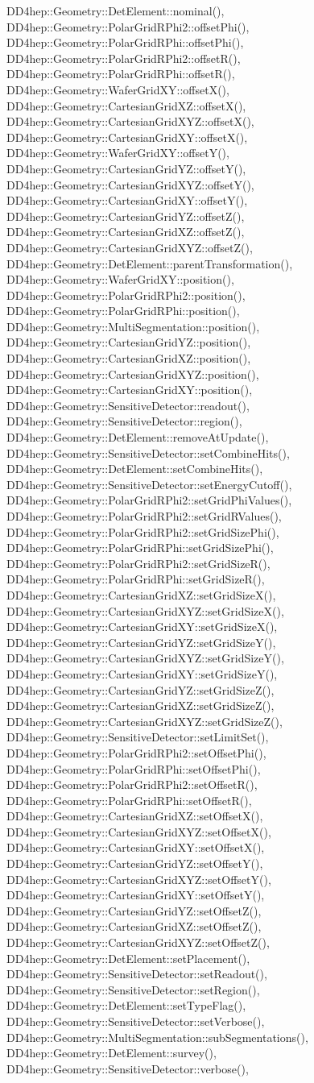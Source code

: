 DD4hep::Geometry::DetElement::nominal(), DD4hep::Geometry::PolarGridRPhi2::offsetPhi(), DD4hep::Geometry::PolarGridRPhi::offsetPhi(), DD4hep::Geometry::PolarGridRPhi2::offsetR(), DD4hep::Geometry::PolarGridRPhi::offsetR(), DD4hep::Geometry::WaferGridXY::offsetX(), DD4hep::Geometry::CartesianGridXZ::offsetX(), DD4hep::Geometry::CartesianGridXYZ::offsetX(), DD4hep::Geometry::CartesianGridXY::offsetX(), DD4hep::Geometry::WaferGridXY::offsetY(), DD4hep::Geometry::CartesianGridYZ::offsetY(), DD4hep::Geometry::CartesianGridXYZ::offsetY(), DD4hep::Geometry::CartesianGridXY::offsetY(), DD4hep::Geometry::CartesianGridYZ::offsetZ(), DD4hep::Geometry::CartesianGridXZ::offsetZ(), DD4hep::Geometry::CartesianGridXYZ::offsetZ(), DD4hep::Geometry::DetElement::parentTransformation(), DD4hep::Geometry::WaferGridXY::position(), DD4hep::Geometry::PolarGridRPhi2::position(), DD4hep::Geometry::PolarGridRPhi::position(), DD4hep::Geometry::MultiSegmentation::position(), DD4hep::Geometry::CartesianGridYZ::position(), DD4hep::Geometry::CartesianGridXZ::position(), DD4hep::Geometry::CartesianGridXYZ::position(), DD4hep::Geometry::CartesianGridXY::position(), DD4hep::Geometry::SensitiveDetector::readout(), DD4hep::Geometry::SensitiveDetector::region(), DD4hep::Geometry::DetElement::removeAtUpdate(), DD4hep::Geometry::SensitiveDetector::setCombineHits(), DD4hep::Geometry::DetElement::setCombineHits(), DD4hep::Geometry::SensitiveDetector::setEnergyCutoff(), DD4hep::Geometry::PolarGridRPhi2::setGridPhiValues(), DD4hep::Geometry::PolarGridRPhi2::setGridRValues(), DD4hep::Geometry::PolarGridRPhi2::setGridSizePhi(), DD4hep::Geometry::PolarGridRPhi::setGridSizePhi(), DD4hep::Geometry::PolarGridRPhi2::setGridSizeR(), DD4hep::Geometry::PolarGridRPhi::setGridSizeR(), DD4hep::Geometry::CartesianGridXZ::setGridSizeX(), DD4hep::Geometry::CartesianGridXYZ::setGridSizeX(), DD4hep::Geometry::CartesianGridXY::setGridSizeX(), DD4hep::Geometry::CartesianGridYZ::setGridSizeY(), DD4hep::Geometry::CartesianGridXYZ::setGridSizeY(), DD4hep::Geometry::CartesianGridXY::setGridSizeY(), DD4hep::Geometry::CartesianGridYZ::setGridSizeZ(), DD4hep::Geometry::CartesianGridXZ::setGridSizeZ(), DD4hep::Geometry::CartesianGridXYZ::setGridSizeZ(), DD4hep::Geometry::SensitiveDetector::setLimitSet(), DD4hep::Geometry::PolarGridRPhi2::setOffsetPhi(), DD4hep::Geometry::PolarGridRPhi::setOffsetPhi(), DD4hep::Geometry::PolarGridRPhi2::setOffsetR(), DD4hep::Geometry::PolarGridRPhi::setOffsetR(), DD4hep::Geometry::CartesianGridXZ::setOffsetX(), DD4hep::Geometry::CartesianGridXYZ::setOffsetX(), DD4hep::Geometry::CartesianGridXY::setOffsetX(), DD4hep::Geometry::CartesianGridYZ::setOffsetY(), DD4hep::Geometry::CartesianGridXYZ::setOffsetY(), DD4hep::Geometry::CartesianGridXY::setOffsetY(), DD4hep::Geometry::CartesianGridYZ::setOffsetZ(), DD4hep::Geometry::CartesianGridXZ::setOffsetZ(), DD4hep::Geometry::CartesianGridXYZ::setOffsetZ(), DD4hep::Geometry::DetElement::setPlacement(), DD4hep::Geometry::SensitiveDetector::setReadout(), DD4hep::Geometry::SensitiveDetector::setRegion(), DD4hep::Geometry::DetElement::setTypeFlag(), DD4hep::Geometry::SensitiveDetector::setVerbose(), DD4hep::Geometry::MultiSegmentation::subSegmentations(), DD4hep::Geometry::DetElement::survey(), DD4hep::Geometry::SensitiveDetector::verbose(), 